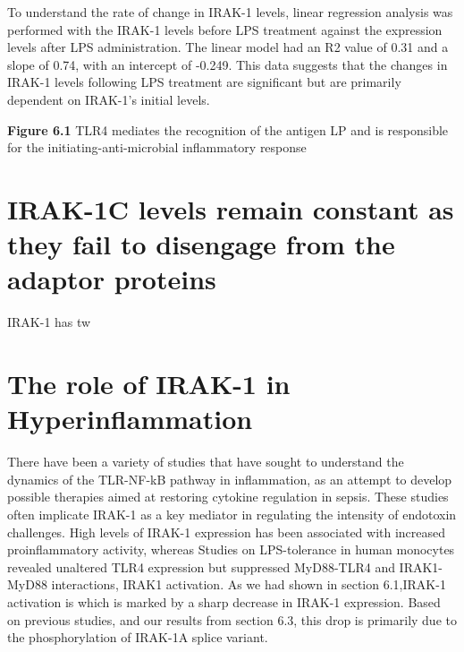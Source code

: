 {To understand the rate of change in IRAK-1 levels, linear regression
analysis was performed with the IRAK-1 levels before LPS treatment
against the expression levels after LPS administration. The linear model
had an R2 value of 0.31 and a slope of 0.74, with an intercept of
-0.249. This data suggests that the changes in IRAK-1 levels following
LPS treatment are significant but are primarily dependent on IRAK-1's
initial levels.



\textbf{Figure 6.1} TLR4 mediates the recognition of the antigen LP and
is responsible for the initiating-anti-microbial inflammatory response

\section{IRAK-1C levels remain constant as they fail to disengage from
the adaptor proteins
}\label{irak-1c-levels-remain-constant-as-they-fail-to-disengage-from-the-adaptor-proteins}

IRAK-1 has tw


\section{The role of IRAK-1 in Hyperinflammation
}\label{the-role-of-irak-1-in-hyperinflammation}

There have been a variety of studies that have sought to understand the
dynamics of the TLR-NF-kB pathway in inflammation, as an attempt to
develop possible therapies aimed at restoring cytokine regulation in
sepsis. These studies often implicate IRAK-1 as a key mediator in
regulating the intensity of endotoxin challenges. High levels of IRAK-1
expression has been associated with increased proinflammatory activity,
whereas Studies on LPS-tolerance in human monocytes revealed unaltered
TLR4 expression but suppressed MyD88-TLR4 and IRAK1-MyD88 interactions,
IRAK1 activation. As we had shown in section 6.1,IRAK-1 activation is
which is marked by a sharp decrease in IRAK-1 expression. Based on
previous studies, and our results from section 6.3, this drop is
primarily due to the phosphorylation of IRAK-1A splice variant.

}
